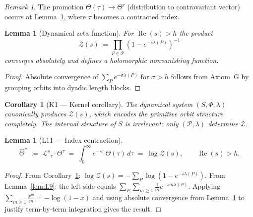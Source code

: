 \documentclass[12pt,a4paper]{article}
\newtheorem{lemma}[theorem]{Lemma}
\newtheorem{corollary}[theorem]{Corollary}
\theoremstyle{remark}
\newtheorem*{remark}{Remark}
\begin{document}
\begin{remark}
The promotion $\Theta(\tau)\to\Theta^\tau$ (distribution to
contravariant vector) occurs at Lemma~\ref{lem:L11}, where $\tau$ becomes
a contracted index.
\end{remark}

\begin{lemma}[Dynamical zeta function]\label{lem:L10}
For $\operatorname{Re}(s)>h$ the product
\[
\mathcal{Z}(s):=\prod_{P\in\mathcal{P}}\!\left(1-e^{-s\lambda(P)}\right)^{-1}
\]
converges absolutely and defines a holomorphic nonvanishing function.
\end{lemma}
\begin{proof}
Absolute convergence of $\sum_P e^{-\sigma\lambda(P)}$ for $\sigma>h$
follows from Axiom~G by grouping orbits into dyadic length blocks.
\end{proof}

\begin{corollary}[K1 --- Kernel corollary]\label{cor:K1}
The dynamical system $(S,\Phi,\lambda)$ canonically produces
$\mathcal{Z}(s)$, which encodes the primitive orbit structure completely.
The internal structure of $S$ is irrelevant: only $(\mathcal{P},\lambda)$ determine $\mathcal{Z}$.
\end{corollary}

\begin{lemma}[L11 --- Index contraction]\label{lem:L11}
\[
\hat\Theta^s
\;:=\; \mathcal{L}^s{}_\tau\cdot\Theta^\tau
\;=\; \int_0^\infty e^{-s\tau}\,\Theta(\tau)\,d\tau
\;=\; \log\mathcal{Z}(s),
\qquad \operatorname{Re}(s)>h.
\]
\end{lemma}
\begin{proof}
From Corollary~\ref{cor:K1}: $\log\mathcal{Z}(s)=-\sum_P\log(1-e^{-s\lambda(P)})$.
From Lemma~\ref{lem:L9}: the left side equals
$\sum_P\sum_{m\ge1}\frac{1}{m}e^{-sm\lambda(P)}$.
Applying $\sum_{m\ge1}\frac{x^m}{m}=-\log(1-x)$ and using absolute
convergence from Lemma~\ref{lem:L10} to justify term-by-term integration
gives the result.
\end{proof}


\end{document}
